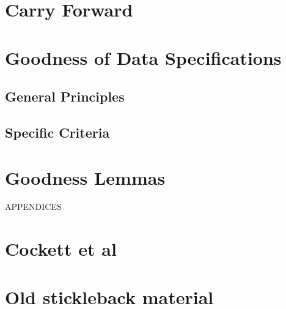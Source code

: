 \documentclass[10pt,a4paper]{article}
\theoremstyle{remark}
\begin{document}
\section{Carry Forward}


\section{Goodness of Data Specifications}
\subsection{General Principles}



\subsection{Specific Criteria}



\section{Goodness Lemmas}








\appendix
APPENDICES
\section{Cockett et al}


\section{Old stickleback material}



 

\end{document}
